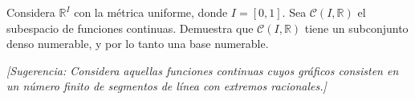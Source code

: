 
 \item Considera $\mathbb{R}^{I}$ con la métrica uniforme, donde $I = [0,1]$.  
    Sea $\mathcal{C}(I, \mathbb{R})$ el subespacio de funciones continuas. Demuestra que $\mathcal{C}(I, \mathbb{R})$ tiene un subconjunto denso numerable, y por lo tanto una base numerable.  

    \textit{[Sugerencia: Considera aquellas funciones continuas cuyos gráficos consisten en un número finito de segmentos de línea con extremos racionales.]}